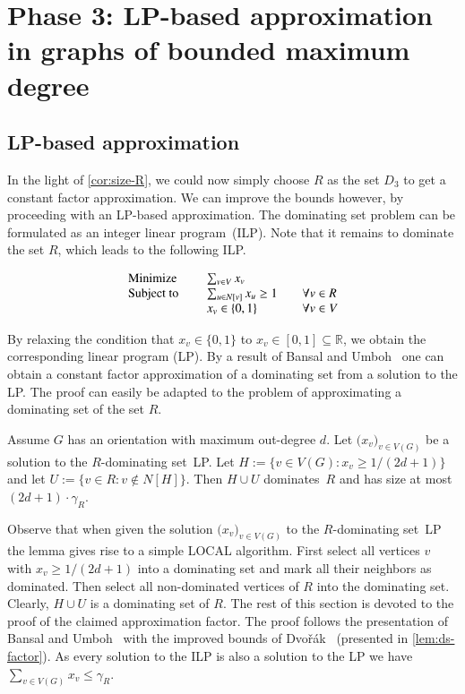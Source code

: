 
\section{Phase 3: LP-based approximation in graphs of bounded maximum degree}\label{sec:LP}


\subsection{LP-based approximation}
In the light of \cref{cor:size-R}, we could now simply choose
$R$ as the set $D_3$ to get a
constant factor approximation. We can improve the bounds however, by
proceeding with an LP-based approximation. The dominating
set problem can be formulated as an integer linear program~(ILP).
Note that it remains to dominate the set $R$, which leads to the
following ILP.

\[
  \begin{array}{l l l}
    \text{Minimize }    & \sum_{v\in V}x_v &\\
    \text{Subject to }\quad & \sum_{u\in N[v]}x_u \ge 1 \quad &\forall v\in R \\
                            & x_v\in \{0,1\}                   &\forall v \in V\\
  \end{array}
\]

By relaxing the condition that $x_v\in \{0,1\}$ to $x_v\in [0,1]\subseteq \mathbb{R}$,
we obtain the corresponding linear program (LP). By a result of
Bansal and Umboh~\cite{bansal2017tight} one can obtain a constant
factor approximation of a dominating set from a solution to the LP.
The proof can easily be adapted to the problem of approximating a
dominating set of the set $R$.

\begin{lemma}\label{lem:ds-factor}
  Assume $G$ has an orientation with maximum out-degree $d$.
  Let $\big(x_v\big)_{v\in V(G)}$ be a solution to the
  $R$-dominating set~LP. Let $H:=\{v\in V(G) : x_v\ge 1/(2d+1)\}$ and
  let $U:=\{v\in R : v\not\in N[H]\}$. Then $H\cup U$ dominates~$R$
  and has size at most $(2d+1)\cdot \gamma_R$.
\end{lemma}

Observe that when given the solution $\big(x_v\big)_{v\in V(G)}$ to the
$R$-dominating set~LP the lemma gives rise to a simple LOCAL algorithm.
First select all vertices $v$ with $x_v\geq 1/(2d+1)$ into a dominating set
and mark all their neighbors as dominated. Then select all non-dominated
vertices of $R$ into the dominating set. Clearly, $H\cup U$ is a dominating
set of $R$. The rest of this section is devoted to the proof of the claimed
approximation factor. The proof follows the presentation of Bansal and
Umboh~\cite{bansal2017tight} with the improved bounds of Dvo\v{r}\'ak~\cite{dvovrak2019distance} (presented in \cref{lem:ds-factor}).
As every solution to the ILP is also a solution
to the LP we have $\sum_{v\in V(G)}x_v\leq \gamma_R$.

